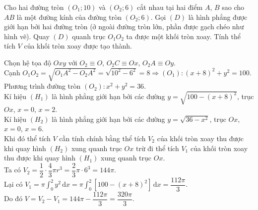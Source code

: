 \begin{bt}%

	Cho hai đường tròn $(O_1;10)$ và $(O_2;6)$ cắt nhau tại hai điểm $A$, $B$ sao cho $AB$ là một đường kính của đường tròn $(O_2;6)$. Gọi $(D)$ là hình phẳng được giới hạn bởi hai đường tròn (ở ngoài đường tròn lớn, phần được gạch chéo như hình vẽ). Quay $(D)$ quanh trục $O_1 O_2$ ta được một khối tròn xoay. Tính thể tích $V$ của khối tròn xoay được tạo thành.
\begin{center}
\end{center}
	
	\loigiai
	{
		Chọn hệ tọa độ $Oxy$ với $O_2 \equiv O$, $O_2 C \equiv Ox$, $O_2 A \equiv Oy$.\\
		Cạnh $O_1 O_2=\sqrt{O_1 A^2-O_2 A^2}=\sqrt{10^2-6^2}=8 \Rightarrow(O_1)\colon (x+8)^2+y^2=100$.\\
		Phương trình đường tròn $(O_2)\colon x^2+y^2=36$.\\
		Kí hiệu $(H_1)$ là hình phẳng giới hạn bởi các đường $y=\sqrt{100-(x+8)^2}$, trục $Ox$, $x=0$, $x=2$.\\	
		Kí hiệu $(H_2)$ là hình phẳng giới hạn bởi các đường $y=\sqrt{36-x^2}$, trục $Ox$, $x=0$, $x=6$.\\
		Khi đó thể tích $V$ cần tính chính bằng thể tích $V_2$ của khối tròn xoay thu được khi quay hình $(H_2)$ xung quanh trục $Ox$ trừ đi thể tích $V_1$ của khối tròn xoay thu được khi quay hình $(H_1)$ xung quanh trục $Ox$.\\
		Ta có $V_2=\dfrac{1}{2} \cdot \dfrac{4}{3} \pi r^3=\dfrac{2}{3} \pi \cdot 6^3=144 \pi$.\\
		Lại có $V_1=\pi \displaystyle\int_0^2 y^2 \mathrm{\,d}x=\pi \displaystyle\int_0^2 [100-(x+8)^2] \mathrm{\,d}x=\dfrac{112 \pi}{3}$.\\
		Do đó $V=V_2-V_1=144 \pi-\dfrac{112 \pi}{3}=\dfrac{320 \pi}{3}$.
	}
\end{bt}

